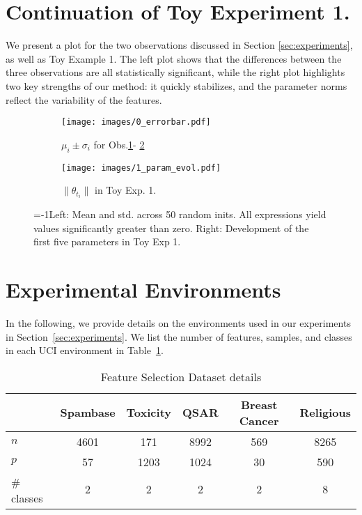 \section{Continuation of Toy Experiment 1.}
\label{appx:sec_C}
We present a plot for the two observations discussed in Section \ref{sec:experiments}, as well as Toy Example 1. The left plot shows that the differences between the three observations are all statistically significant, while the right plot highlights two key strengths of our method: it quickly stabilizes, and the parameter norms reflect the variability of the features.


\begin{figure}[ht]
  \centering
  \begin{subfigure}[b]{0.4\textwidth}
    \centering
    \texttt{[image: images/0\_errorbar.pdf]}
    \caption{$\mu_i\pm\sigma_i$ for Obs.\hyperlink{obs_1}{1}- \hyperlink{obs_2}{2}}
    \label{plt:0_error_bar}
  \end{subfigure}%
  \begin{subfigure}[b]{0.4\textwidth}
    \centering
    \texttt{[image: images/1\_param\_evol.pdf]}
    \caption{$\|\theta_{t_{i}}\|$ in Toy Exp. 1.}
    \label{plt:1_param_evol}
  \end{subfigure}
    \caption{\looseness=-1Left: Mean and std. across 50 random inits. All expressions yield values significantly greater than zero. Right: Development of the first five parameters in Toy Exp 1. }
  \label{fig:plots}
\end{figure}


\section{Experimental Environments}
\label{appx:sec_D}

In the following, we provide details on the environments used in our experiments in Section~\ref{sec:experiments}. We list the number of features, samples, and classes in each UCI environment in Table~\ref{tab:num_tasks_samples}.


%
\begin{table}[ht]
\centering
\begin{tabular}{l|ccccc}
 & Spambase  & Toxicity & QSAR & Breast Cancer & Religious\\ \toprule
 $n$ &  4601 & 171 & 8992 & 569 & 8265  \\ 
 $p$ & 57  & 1203 &  1024 & 30 & 590  \\ 
 \# classes & $2$ & $2$ & $2$ & $2$ & $8$ \\  \bottomrule

\end{tabular}
\caption{Feature Selection Dataset details}
\label{tab:num_tasks_samples}
\end{table}


